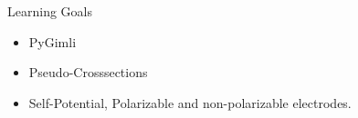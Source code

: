 \begin{frame}
  \begin{PointSix}{Learning Goals}
    \begin{itemize}
      \item \alert{PyGimli}
      \item \alert{Pseudo-Crosssections}
      \item \alert{Self-Potential, Polarizable and non-polarizable electrodes.}
    \end{itemize}
  \end{PointSix}
\end{frame}

